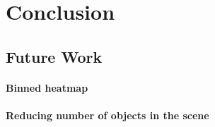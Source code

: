 \section{Conclusion}

\subsection{Future Work}

\paragraph{Binned heatmap}

\paragraph{Reducing number of objects in the scene}